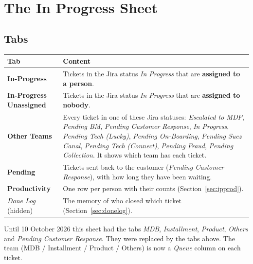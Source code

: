 \documentclass[11pt,a4paper]{article}
\newcommand{\tab}[1]{\textbf{#1}}
\let\oldsection\section
\renewcommand{\section}{\needspace{12\baselineskip}\oldsection}
\let\oldsubsection\subsection
\renewcommand{\subsection}{\needspace{7\baselineskip}\oldsubsection}
\begin{document}
\section{The In Progress Sheet}

\subsection{Tabs}
\begin{tabularx}{\linewidth}{@{}l L@{}}
\toprule
\textbf{Tab} & \textbf{Content} \\
\midrule
\tab{In-Progress} & Tickets in the Jira status \emph{In Progress} that are \textbf{assigned to a person}. \\
\tab{In-Progress Unassigned} & Tickets in the Jira status \emph{In Progress} that are \textbf{assigned to nobody}. \\
\tab{Other Teams} & Every ticket in one of these Jira statuses: \emph{Escalated to MDP}, \emph{Pending BM},
\emph{Pending Customer Response}, \emph{In Progress}, \emph{Pending Tech (Lucky)}, \emph{Pending On-Boarding},
\emph{Pending Suez Canal}, \emph{Pending Tech (Connect)}, \emph{Pending Fraud}, \emph{Pending Collection}.
It shows which team has each ticket. \\
\tab{Pending} & Tickets sent back to the customer (\emph{Pending Customer Response}), with how long they have been
waiting. \\
\tab{Productivity} & One row per person with their counts (Section~\ref{sec:ipprod}). \\
\emph{Done Log} (hidden) & The memory of who closed which ticket (Section~\ref{sec:donelog}). \\
\bottomrule
\end{tabularx}

\begin{note}
Until 10 October 2026 this sheet had the tabs \emph{MDB}, \emph{Installment}, \emph{Product}, \emph{Others} and
\emph{Pending Customer Response}. They were replaced by the tabs above. The team (MDB / Installment / Product / Others)
is now a \emph{Queue} column on each ticket.
\end{note}
\end{document}
